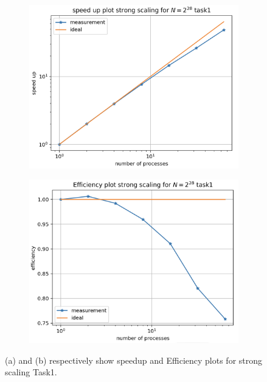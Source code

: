 \documentclass[12pt,a4paper]{article}
\begin{document}
\begin{enumerate}
\begin{figure}[h]
	\begin{subfigure}[b]{0.5\textwidth}
		\centering
		\includegraphics[width=1.0\linewidth]{"t1s"}
		\caption{}
		\label{fig:speedup_task1}
	\end{subfigure}
	\begin{subfigure}[b]{0.5\textwidth}
		\centering
		\includegraphics[width=1.0\linewidth]{"t1e"}
		\caption{}
		\label{fig:t1e}
	\end{subfigure}
	\caption{(a) and (b) respectively show speedup and Efficiency plots for strong scaling Task1. }
\end{figure}


\end{enumerate}
\end{document}
